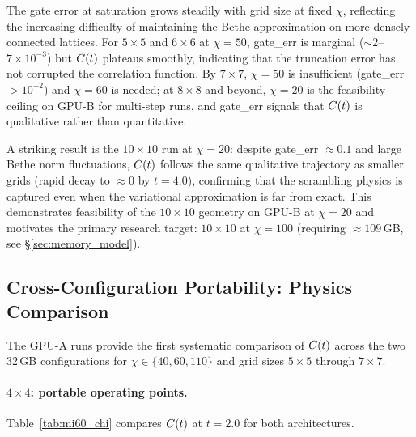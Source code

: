 The gate error at saturation grows steadily with grid size at fixed $\chi$,
reflecting the increasing difficulty of maintaining the Bethe approximation
on more densely connected lattices.
For $5\times5$ and $6\times6$ at $\chi=50$, gate\_err is marginal
($\sim 2$--$7\times10^{-3}$) but $C(t)$ plateaus smoothly, indicating that
the truncation error has not corrupted the correlation function.
By $7\times7$, $\chi=50$ is insufficient (gate\_err $> 10^{-2}$) and $\chi=60$
is needed; at $8\times8$ and beyond, $\chi=20$ is the feasibility ceiling on
GPU-B for multi-step runs, and gate\_err signals that $C(t)$ is qualitative rather
than quantitative.

A striking result is the $10\times10$ run at $\chi=20$:
despite gate\_err $\approx 0.1$ and large Bethe norm fluctuations,
$C(t)$ follows the same qualitative trajectory as smaller grids
(rapid decay to $\approx 0$ by $t = 4.0$), confirming that the scrambling
physics is captured even when the variational approximation is far from exact.
This demonstrates feasibility of the $10\times10$ geometry on GPU-B at $\chi=20$
and motivates the primary research target: $10\times10$ at $\chi=100$
(requiring $\approx109$\,GB, see §\ref{sec:memory_model}).

\subsection{Cross-Configuration Portability: Physics Comparison}
\label{sec:portability_physics}

The GPU-A runs provide the first systematic comparison of
$C(t)$ across the two 32\,GB configurations for $\chi \in \{40, 60, 110\}$
and grid sizes $5\times5$ through $7\times7$.

\paragraph{$4\times4$: portable operating points.}
Table~\ref{tab:mi60_chi} compares $C(t)$ at $t=2.0$ for both architectures.

